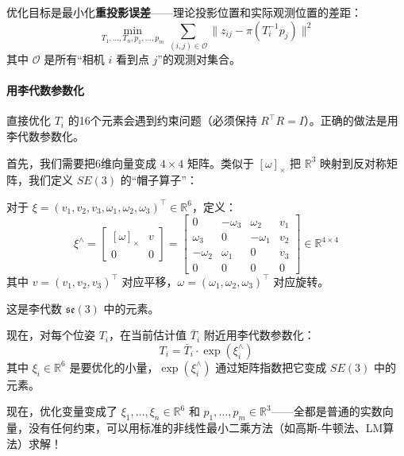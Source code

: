 优化目标是最小化\textbf{重投影误差}——理论投影位置和实际观测位置的差距：
\begin{equation}
\min_{T_1, \ldots, T_n, p_1, \ldots, p_m} \sum_{(i,j) \in \mathcal{O}} \| z_{ij} - \pi(T_i^{-1} p_j) \|^2
\end{equation}
其中 $\mathcal{O}$ 是所有“相机 $i$ 看到点 $j$”的观测对集合。

\paragraph{用李代数参数化}

直接优化 $T_i$ 的16个元素会遇到约束问题（必须保持 $R^\top R = I$）。正确的做法是用李代数参数化。

首先，我们需要把6维向量变成 $4 \times 4$ 矩阵。类似于 $[\omega]_\times$ 把 $\mathbb{R}^3$ 映射到反对称矩阵，我们定义 $SE(3)$ 的“帽子算子”：

\begin{definition}
对于 $\xi = (v_1, v_2, v_3, \omega_1, \omega_2, \omega_3)^\top \in \mathbb{R}^6$，定义：
\begin{equation}
\xi^\wedge = \begin{bmatrix} [\omega]_\times & v \\ 0 & 0 \end{bmatrix} = 
\begin{bmatrix} 
0 & -\omega_3 & \omega_2 & v_1 \\
\omega_3 & 0 & -\omega_1 & v_2 \\
-\omega_2 & \omega_1 & 0 & v_3 \\
0 & 0 & 0 & 0
\end{bmatrix} \in \mathbb{R}^{4 \times 4}
\end{equation}
其中 $v = (v_1, v_2, v_3)^\top$ 对应平移，$\omega = (\omega_1, \omega_2, \omega_3)^\top$ 对应旋转。

这是李代数 $\mathfrak{se}(3)$ 中的元素。
\end{definition}

现在，对每个位姿 $T_i$，在当前估计值 $\bar{T}_i$ 附近用李代数参数化：
\begin{equation}
T_i = \bar{T}_i \cdot \exp(\xi_i^\wedge)
\end{equation}
其中 $\xi_i \in \mathbb{R}^6$ 是要优化的小量，$\exp(\xi_i^\wedge)$ 通过矩阵指数把它变成 $SE(3)$ 中的元素。

现在，优化变量变成了 $\xi_1, \ldots, \xi_n \in \mathbb{R}^6$ 和 $p_1, \ldots, p_m \in \mathbb{R}^3$——全都是普通的实数向量，没有任何约束，可以用标准的非线性最小二乘方法（如高斯-牛顿法、LM算法）求解！

